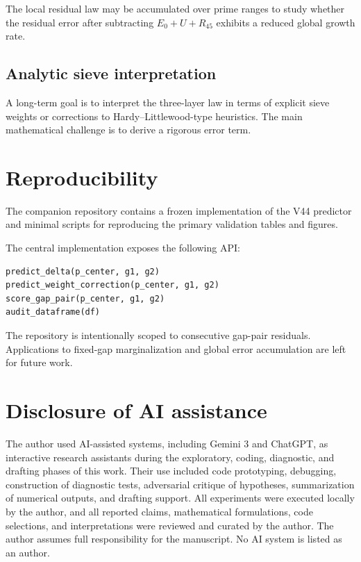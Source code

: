 \documentclass[11pt]{article}
\begin{document}
The local residual law may be accumulated over prime ranges to study whether the residual error after subtracting \(E_0+U+R_{45}\) exhibits a reduced global growth rate.

\subsection{Analytic sieve interpretation}

A long-term goal is to interpret the three-layer law in terms of explicit sieve weights or corrections to Hardy--Littlewood-type heuristics. The main mathematical challenge is to derive a rigorous error term.

\section{Reproducibility}

The companion repository contains a frozen implementation of the V44 predictor and minimal scripts for reproducing the primary validation tables and figures.

The central implementation exposes the following API:
\begin{verbatim}
predict_delta(p_center, g1, g2)
predict_weight_correction(p_center, g1, g2)
score_gap_pair(p_center, g1, g2)
audit_dataframe(df)
\end{verbatim}

The repository is intentionally scoped to consecutive gap-pair residuals. Applications to fixed-gap marginalization and global error accumulation are left for future work.

\section{Disclosure of AI assistance}

The author used AI-assisted systems, including Gemini 3 and ChatGPT, as interactive research assistants during the exploratory, coding, diagnostic, and drafting phases of this work. Their use included code prototyping, debugging, construction of diagnostic tests, adversarial critique of hypotheses, summarization of numerical outputs, and drafting support. All experiments were executed locally by the author, and all reported claims, mathematical formulations, code selections, and interpretations were reviewed and curated by the author. The author assumes full responsibility for the manuscript. No AI system is listed as an author.

\appendix
\end{document}
